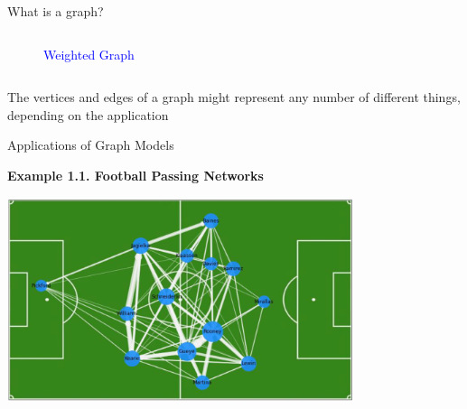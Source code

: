 \documentclass[aspectratio=169]{beamer}
\providecommand{\Blue}[1]{\textcolor{blue}{#1}}
\begin{document}
\begin{frame}[plain]{What is a graph?}
\begin{figure}
\begin{columns}[t,onlytextwidth]
\smallskip

\begin{center}
 \Blue{Weighted Graph}
\end{center}

\end{columns}

\end{figure}

\medskip

The vertices and edges of a graph might represent any number of different things, depending on the
application


\end{frame}


\begin{frame}[plain]{Applications of Graph Models}

{\bf Example 1.1.  Football Passing Networks}

  \begin{center}
	      \includegraphics[height=6cm]{./img/lecture1-fig1.png}
  \end{center}

\end{frame}	
\end{document}
